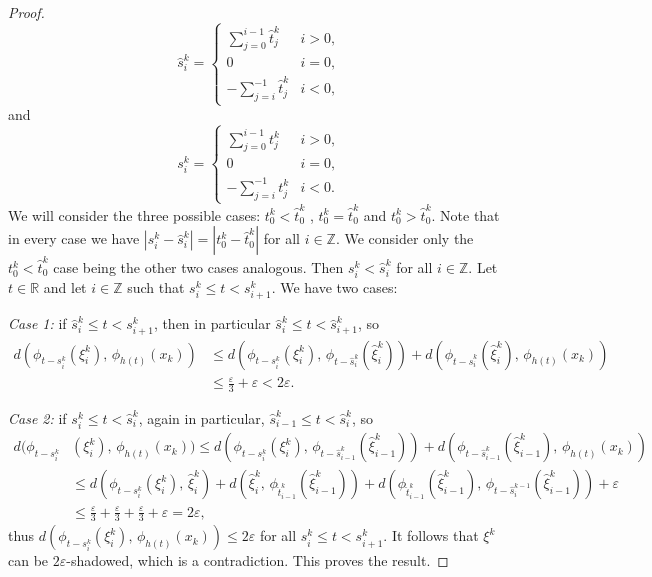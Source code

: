 \documentclass{amsart}
\theoremstyle{definition}
\newcommand{\ep}{\varepsilon}
\begin{document}
\begin{proof}
       \[\hat{s}_i^k =
      \begin{cases}
        \displaystyle{\sum_{j=0}^{i-1}} \hat{t}_j^k & i > 0,\\
		    0				             & i = 0, \\
		    - \displaystyle{\sum_{j=i}^{-1}} \hat{t}_j^k & i < 0,
      \end{cases}
    \]
and 
   \[s_i^k =
      \begin{cases}
         \displaystyle{\sum_{j=0}^{i-1}} t_j^k & i > 0,\\
		    0				             & i = 0, \\
		    - \displaystyle{\sum_{j=i}^{-1}} t_j^k & i < 0.
      \end{cases}
    \]
We will consider the three possible cases: $t_0^k < \hat{t}_0^k$ , $t_0^k = \hat{t}_0^k$ and $t_0^k > \hat{t}_0^k$. Note that in every case we have $|s_i^k - \hat{s}_i^k| = |t_0^k - \hat{t}_0^k|$ for all $i\in\mathbb{Z}$. We consider only the $t_0^k < \hat{t}_0^k$ case being the other two cases analogous. Then $s_i^k < \hat{s}_i^k$ for all $i\in\mathbb{Z}$. Let $t\in \mathbb{R}$ and let $i\in\mathbb{Z}$ such that $s_i^k\leq  t < s_{i+1}^k$. We have two cases:

\emph{Case 1:} if $\hat{s}_i^k\leq  t < s_{i+1}^k$,  then in particular $\hat{s}_i^k\leq  t < \hat{s}_{i+1}^k$, so
    \begin{align*}
    d(\phi_{t-s_i^k}(\xi_i^k),\,\phi_{h(t)}(x_k))&\leq d(\phi_{t-s_i^k}(\xi_i^k),\,\phi_{t-\hat{s}_i^k}(\hat{\xi}_i^k)) + d(\phi_{t-\hat{s}_i^k}(\hat{\xi}_i^k),\,\phi_{h(t)}(x_k))\\
 &\leq\frac{\ep}{3} + \ep < 2\ep.
\end{align*}  

\emph{Case 2:} if $s_i^k\leq t < \hat{s}_i^k$, again in particular, $\hat{s}_{i-1}^k\leq t < \hat{s}_i^k$, so
    \begin{align*}
    d(\phi_{t-s_i^k}&(\xi_i^k),\,\phi_{h(t)}(x_k)) \leq  d(\phi_{t-s_i^k}(\xi_i^k),\,\phi_{t-\hat{s}_{i-1}^{k}}(\hat{\xi}_{i-1}^{k})) + d(\phi_{t-\hat{s}_{i-1}^{k}}(\hat{\xi}_{i-1}^{k}),\,\phi_{h(t)}(x_k))\\
    &\leq  d(\phi_{t-s_i^k}(\xi_i^k),\,\hat{\xi}_i^k) + d(\hat{\xi}_i^k,\,\phi_{\hat{t}_{i-1}^k}(\hat{\xi}_{i-1}^k)) + d(\phi_{\hat{t}_{i-1}^k}(\hat{\xi}_{i-1}^k),\,\phi_{t-\hat{s}_i^{k-1}}(\hat{\xi}_{i-1}^{k})) + \ep\\
    &\leq \frac{\ep}{3} + \frac{\ep}{3} + \frac{\ep}{3} + \ep = 2\ep,
    \end{align*}
thus $d(\phi_{t-s_i^k}(\xi_i^k),\,\phi_{h(t)}(x_k))\leq 2\ep$ for all $s_i^k\leq  t < s_{i+1}^k$. It follows that $\xi^k$ can be $2\ep$-shadowed, which is a contradiction. This proves the result. 
    \end{proof}
     
\end{document}
